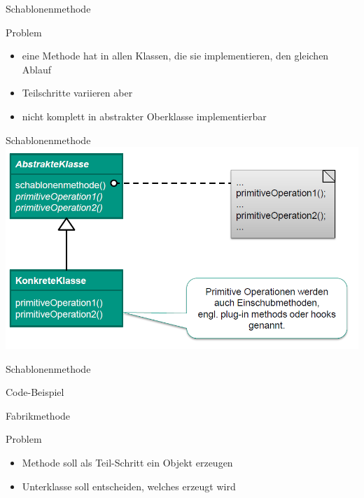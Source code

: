 \documentclass[18pt]{beamer}
\begin{document}
	\begin{frame}{Schablonenmethode}
		\begin{block}{Problem}
			\begin{itemize}
				\item eine Methode hat in allen Klassen, die sie implementieren, den gleichen Ablauf
				\item Teilschritte variieren aber
				\item nicht komplett in abstrakter Oberklasse implementierbar
			\end{itemize}
		\end{block}
	\end{frame}

	\begin{frame}{Schablonenmethode}
		\includegraphics[scale=0.45]{./pics/tut4/schab.png}
	\end{frame}

	\begin{frame}{Schablonenmethode}
		\begin{huge}
			\begin{center}
				Code-Beispiel
			\end{center}
		\end{huge}
	\end{frame}

	\begin{frame}{Fabrikmethode}
		\begin{block}{Problem}
			\begin{itemize}
				\item Methode soll als Teil-Schritt ein Objekt erzeugen
				\item Unterklasse soll entscheiden, welches erzeugt wird
			\end{itemize}
		\end{block}
	\end{frame}
\end{document}
